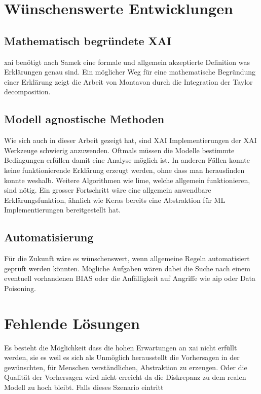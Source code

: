 \documentclass[
  12pt, %
  a4paper, %
  oneside, %
  openany, 
  numbers=noenddot, %
  BCOR=5mm, %
  parskip=half*, %
  thesis, %
]{bfhbook}
\begin{document}
\section{Wünschenswerte Entwicklungen}

\subsection{Mathematisch begründete XAI}
\Gls{xai} benötigt nach Samek \parencite{Samek2019a} eine formale und allgemein akzeptierte Definition was Erklärungen genau sind.
Ein möglicher Weg für eine mathematische Begründung einer Erklärung zeigt die Arbeit von Montavon \parencite{Montavon2017} durch die Integration der Taylor decomposition.

\subsection{Modell agnostische Methoden}
Wie sich auch in dieser Arbeit gezeigt hat, sind \acrshort{XAI} Implementierungen der XAI Werkzeuge schwierig anzuwenden. Oftmals müssen die Modelle bestimmte Bedingungen erfüllen damit eine Analyse möglich ist. In anderen Fällen konnte keine funktionierende Erklärung erzeugt werden, ohne dass man herausfinden konnte weshalb. Weitere Algorithmen wie \acrshort{lime}, welche allgemein funktionieren, sind nötig. Ein grosser Fortschritt wäre eine allgemein anwendbare Erklärungsfunktion, ähnlich wie Keras bereits eine Abstraktion für \Gls{ML} Implementierungen bereitgestellt hat. 

\subsection{Automatisierung}
Für die Zukunft wäre es wünschenswert, wenn allgemeine Regeln automatisiert geprüft werden könnten. Mögliche Aufgaben wären dabei die Suche nach einem eventuell vorhandenen \Gls{BIAS} oder die Anfälligkeit auf Angriffe wie \acrlong{aip} oder Data Poisoning.

\section{Fehlende Lösungen}
Es besteht die Möglichkeit dass die hohen Erwartungen an \Gls{xai} nicht erfüllt werden, sie es weil es sich als Unmöglich herausstellt die Vorhersagen in der gewünschten, für Menschen verständlichen, Abstraktion zu erzeugen. Oder die Qualität der Vorhersagen wird nicht erreicht da die Diskrepanz zu dem realen Modell zu hoch bleibt. Falls dieses Szenario eintritt 
\parencite{Rudin2018}
\end{document}
